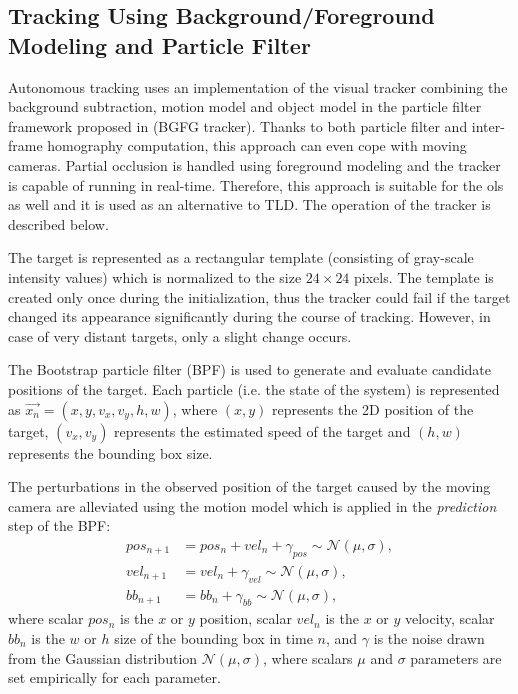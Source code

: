 \subsection{Tracking Using Background/Foreground Modeling and Particle Filter} \label{txt:bgfg_tracker}

Autonomous tracking uses an implementation of the visual tracker combining the background subtraction, motion model and object model in the particle filter framework  proposed in \cite{ObjectTrackinginMonochromaticVideo} (BGFG tracker). Thanks to both particle filter and inter-frame homography computation, this approach can even cope with moving cameras. Partial occlusion is handled using foreground modeling and the tracker is capable of running in real-time. Therefore, this approach is suitable for the \gls{ols} as well and it is used as an alternative to TLD. The operation of the tracker is described below.

The target is represented as a rectangular template (consisting of gray-scale intensity values) which is normalized to the size $24\times24$ pixels. The template is created only once during the initialization, thus the tracker could fail if the target changed its appearance significantly during the course of tracking. However, in case of very distant targets, only a slight change occurs.

The Bootstrap particle filter (BPF) \cite{Isard98condensation} is used to generate and evaluate candidate positions of the target. Each particle (i.e. the state of the system) is represented as $\vec{x_{n}} = (x, y, v_{x}, v_{y}, h, w)$, where $(x, y)$ represents the 2D position of the target, $(v_{x}, v_{y})$ represents the estimated speed of the target and $(h, w)$ represents the bounding box size. 

The perturbations in the observed position of the target caused by the moving camera are alleviated using the motion model which is applied in the \textit{prediction} step of the BPF:
\begin{align}
	pos_{n+1} &= pos_{n} + vel_{n} + \gamma_{pos} \sim \mathcal{N}(\mu, \sigma),\\ \label{eq:bgfg_pos_prediction}
	vel_{n+1} &= vel_{n} + \gamma_{vel} \sim \mathcal{N}(\mu, \sigma),\\
	bb_{n+1} &= bb_{n} + \gamma_{bb} \sim \mathcal{N}(\mu, \sigma),	
\end{align}
where scalar $pos_{n}$ is the $x$ or $y$ position, scalar $vel_{n}$ is the $x$ or $y$ velocity, scalar $bb_{n}$ is the $w$ or $h$ size of the bounding box in time $n$, and $\gamma$ is the noise drawn from the Gaussian distribution $\mathcal{N}(\mu, \sigma)$, where scalars $\mu$ and $\sigma$ parameters are set empirically for each parameter.

